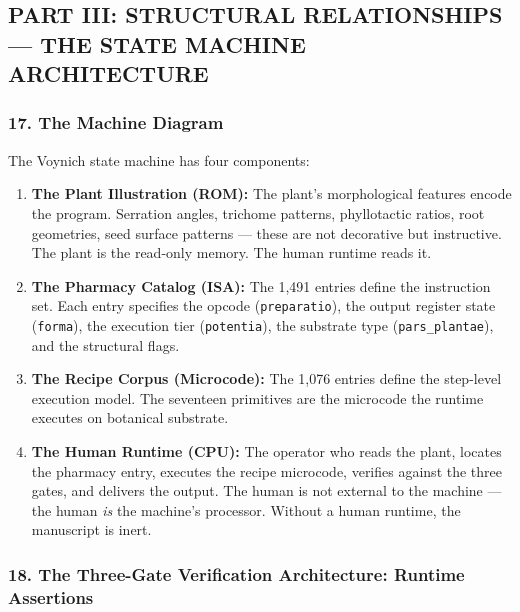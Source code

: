 \hypertarget{part-iii-structural-relationships-the-state-machine-architecture}{%
\subsection{PART III: STRUCTURAL RELATIONSHIPS --- THE STATE MACHINE
ARCHITECTURE}\label{part-iii-structural-relationships-the-state-machine-architecture}}

\hypertarget{the-machine-diagram}{%
\subsubsection{17. The Machine Diagram}\label{the-machine-diagram}}

The Voynich state machine has four components:

\begin{enumerate}
\def\labelenumi{\arabic{enumi}.}
\item
  \textbf{The Plant Illustration (ROM):} The plant's morphological
  features encode the program. Serration angles, trichome patterns,
  phyllotactic ratios, root geometries, seed surface patterns --- these
  are not decorative but instructive. The plant is the read-only memory.
  The human runtime reads it.
\item
  \textbf{The Pharmacy Catalog (ISA):} The 1,491 entries define the
  instruction set. Each entry specifies the opcode
  (\texttt{preparatio}), the output register state (\texttt{forma}), the
  execution tier (\texttt{potentia}), the substrate type
  (\texttt{pars\_plantae}), and the structural flags.
\item
  \textbf{The Recipe Corpus (Microcode):} The 1,076 entries define the
  step-level execution model. The seventeen primitives are the microcode
  the runtime executes on botanical substrate.
\item
  \textbf{The Human Runtime (CPU):} The operator who reads the plant,
  locates the pharmacy entry, executes the recipe microcode, verifies
  against the three gates, and delivers the output. The human is not
  external to the machine --- the human \emph{is} the machine's
  processor. Without a human runtime, the manuscript is inert.
\end{enumerate}

\hypertarget{the-three-gate-verification-architecture-runtime-assertions}{%
\subsubsection{18. The Three-Gate Verification Architecture: Runtime
Assertions}\label{the-three-gate-verification-architecture-runtime-assertions}}


